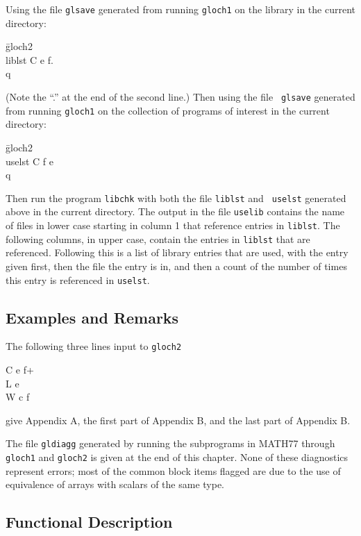 \documentclass[twoside]{MATH77}
\begin{document}
Using the file {\tt glsave} generated from running {\tt gloch1} on the
library in the current directory:
\begin{tabbing}
\hspace{.5in}\=gloch2\\
\>liblst C e f.\\
\>q
\end{tabbing}
(Note the ``.'' at the end of the second line.) Then using the file {\tt
glsave} generated from running {\tt gloch1} on the collection of programs
of interest in the current directory:
\begin{tabbing}
\hspace{.5in}\=gloch2\\
\>uselst C f e\\
\>q
\end{tabbing}

Then run the program {\tt libchk} with both the file {\tt liblst} and {\tt
uselst} generated above in the current directory.  The output in the file
{\tt uselib} contains the name of files in lower case starting in column 1
that reference entries in {\tt liblst}.  The following columns, in upper
case, contain the entries in {\tt liblst} that are referenced.  Following
this is a list of library entries that are used, with the entry given
first, then the file the entry is in, and then a count of the number of
times this entry is referenced in {\tt uselst}.

\subsection{Examples and Remarks}
The following three lines input to {\tt gloch2}

C e f+\\
L e\\
W c f

give Appendix A, the first part of Appendix B, and the last part of
Appendix B.

The file {\tt gldiagg} generated by running the subprograms in MATH77
through {\tt gloch1} and {\tt gloch2} is given at the end of this chapter.
None of these diagnostics represent errors; most of the common block items
flagged are due to the use of equivalence of arrays with scalars of the
same type.

\subsection{Functional Description}
\end{document}
